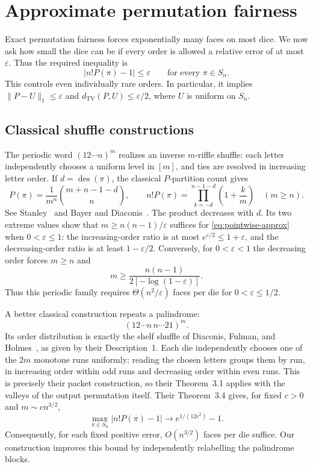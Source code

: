\section{Approximate permutation fairness}\label{sec:approximate}

Exact permutation fairness forces exponentially many faces on most dice.
We now ask how small the dice can be if every order is allowed a relative
error of at most $\varepsilon$.  Thus the required inequality is
\begin{equation}\label{eq:pointwise-approx}
  \left|n!P(\pi)-1\right|\leq\varepsilon
  \qquad\text{for every }\pi\in S_n.
\end{equation}
This controls even individually rare orders.  In particular, it implies
$\lVert P-U\rVert_1\leq\varepsilon$ and
$d_{\mathrm{TV}}(P,U)\leq\varepsilon/2$, where $U$ is uniform on $S_n$.

\subsection{Classical shuffle constructions}

The periodic word $(12\cdots n)^m$ realizes an inverse $m$-riffle shuffle:
each letter independently chooses a uniform level in $[m]$, and ties are
resolved in increasing letter order.  If $d=\operatorname{des}(\pi)$,
the classical $P$-partition count gives
\begin{equation}\label{eq:descent-count}
  P(\pi)=\frac1{m^n}\binom{m+n-1-d}{n},
  \qquad
  n!P(\pi)=\prod_{k=-d}^{n-1-d}\left(1+\frac{k}{m}\right)
  \quad(m\geq n).
\end{equation}
See Stanley~\cite{stanley1972} and Bayer and Diaconis~\cite{bayer-diaconis1992}.
The product decreases with $d$.  Its two extreme values show that
$m\geq n(n-1)/\varepsilon$ suffices for \eqref{eq:pointwise-approx} when
$0<\varepsilon\leq1$: the increasing-order ratio is at most
$e^{\varepsilon/2}\leq1+\varepsilon$, and the decreasing-order ratio is at
least $1-\varepsilon/2$.  Conversely, for $0<\varepsilon<1$ the decreasing
order forces $m\geq n$ and
\[
  m\geq\frac{n(n-1)}{2[-\log(1-\varepsilon)]}.
\]
Thus this periodic family requires $\Theta(n^2/\varepsilon)$ faces per
die for $0<\varepsilon\leq1/2$.

A better classical construction repeats a palindrome:
\[
  (12\cdots n\,n\cdots21)^m.
\]
Its order distribution is exactly the shelf shuffle of Diaconis, Fulman,
and Holmes~\cite{diaconis-fulman-holmes2013}, as given by their
Description~1.  Each die independently chooses one of the \(2m\)
monotone runs uniformly; reading the chosen letters groups them by run,
in increasing order within odd runs and decreasing order within even
runs.  This is precisely their packet construction, so their
Theorem~3.1 applies with the valleys of the output permutation itself.
Their Theorem~3.4 gives, for fixed $c>0$ and $m\sim cn^{3/2}$,
\[
  \max_{\pi\in S_n}|n!P(\pi)-1|
  \longrightarrow e^{1/(12c^2)}-1.
\]
Consequently, for each fixed positive error, $O(n^{3/2})$ faces per die
suffice.  Our construction improves this bound by independently relabelling
the palindrome blocks.

